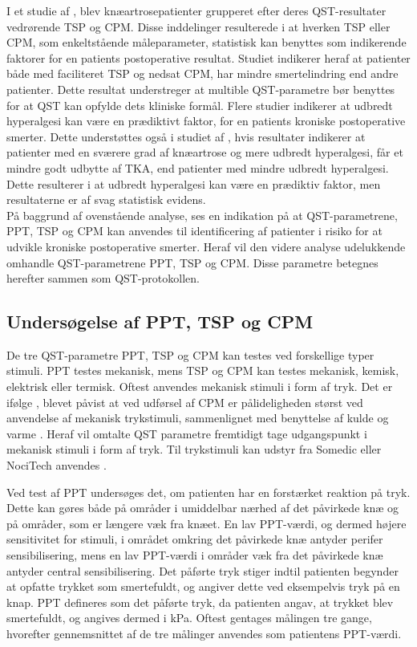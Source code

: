 I et studie af , blev knæartrosepatienter grupperet efter deres QST-resultater vedrørende TSP og CPM. Disse inddelinger resulterede i at hverken TSP eller CPM, som enkeltstående måleparameter, statistisk kan benyttes som indikerende faktorer for en patients postoperative resultat. Studiet indikerer heraf at patienter både med faciliteret TSP og nedsat CPM, har mindre smertelindring end andre patienter. Dette resultat understreger at multible QST-parametre bør benyttes for at QST kan opfylde dets kliniske formål. \citep{Petersen2016} Flere studier indikerer at udbredt hyperalgesi kan være en prædiktivt faktor, for en patients kroniske postoperative smerter. \citep{Petersen2016} \citep{Wylde2013} Dette understøttes også i studiet af , hvis resultater indikerer at patienter med en sværere grad af knæartrose og mere udbredt hyperalgesi, får et mindre godt udbytte af TKA, end patienter med mindre udbredt hyperalgesi. Dette resulterer i at udbredt hyperalgesi kan være en prædiktiv faktor, men resultaterne er af svag statistisk evidens. \citep{Wylde2016c}\\
På baggrund af ovenstående analyse, ses en indikation på at QST-parametrene, PPT, TSP og CPM kan anvendes til identificering af patienter i risiko for at udvikle kroniske postoperative smerter. Heraf vil den videre analyse udelukkende omhandle QST-parametrene PPT, TSP og CPM. Disse parametre betegnes herefter sammen som QST-protokollen. 

\subsection{Undersøgelse af PPT, TSP og CPM}
De tre QST-parametre PPT, TSP og CPM kan testes ved forskellige typer stimuli. PPT testes mekanisk, mens TSP og CPM kan testes mekanisk, kemisk, elektrisk eller termisk. Oftest anvendes mekanisk stimuli i form af tryk. \citep{Suokas2012} \citep{Yarnitsky2006} Det er ifølge \citep{Imai2016}, blevet påvist at ved udførsel af CPM er pålideligheden størst ved anvendelse af mekanisk trykstimuli, sammenlignet med benyttelse af kulde og varme \citep{Imai2016}. Heraf vil omtalte QST parametre fremtidigt tage udgangspunkt i mekanisk stimuli i form af tryk. Til trykstimuli kan udstyr fra Somedic eller NociTech anvendes \citep{Wylde2015b} \citep{Petersen2016}. 

Ved test af PPT undersøges det, om patienten har en forstærket reaktion på tryk. Dette kan gøres både på områder i umiddelbar nærhed af det påvirkede knæ og på områder, som er længere væk fra knæet. En lav PPT-værdi, og dermed højere sensitivitet for stimuli, i området omkring det påvirkede knæ antyder perifer sensibilisering, mens en lav PPT-værdi i områder væk fra det påvirkede knæ antyder central sensibilisering. \citep{Suokas2012} Det påførte tryk stiger indtil patienten begynder at opfatte trykket som smertefuldt, og angiver dette ved eksempelvis tryk på en knap. PPT defineres som det påførte tryk, da patienten angav, at trykket blev smertefuldt, og angives dermed i kPa. Oftest gentages målingen tre gange, hvorefter gennemsnittet af de tre målinger anvendes som patientens PPT-værdi. \citep{Petersen2015} \citep{Wylde2015b} 

